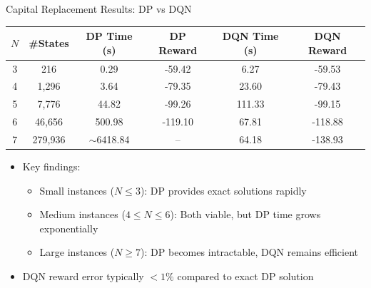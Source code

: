 \documentclass[10pt]{beamer}
\begin{document}
\begin{frame}{Capital Replacement Results: DP vs DQN}
    \begin{table}
        \centering
        \small
        \begin{tabular}{cccccc}
            \toprule
            $N$ & \#States & DP Time (s) & DP Reward & DQN Time (s) & DQN Reward \\
            \midrule
            3 & 216 & 0.29 & -59.42 & 6.27 & -59.53 \\
            4 & 1,296 & 3.64 & -79.35 & 23.60 & -79.43 \\
            5 & 7,776 & 44.82 & -99.26 & 111.33 & -99.15 \\
            6 & 46,656 & 500.98 & -119.10 & 67.81 & -118.88 \\
            7 & 279,936 & $\sim$6418.84 & -- & 64.18 & -138.93 \\
            \bottomrule
        \end{tabular}
    \end{table}
    
    \begin{itemize}
        \item Key findings:
        \begin{itemize}
            \item Small instances ($N \leq 3$): DP provides exact solutions rapidly
            \item Medium instances ($4 \leq N \leq 6$): Both viable, but DP time grows exponentially
            \item Large instances ($N \geq 7$): DP becomes intractable, DQN remains efficient
        \end{itemize}
        \item DQN reward error typically $< 1\%$ compared to exact DP solution
    \end{itemize}
\end{frame}

\end{document}
